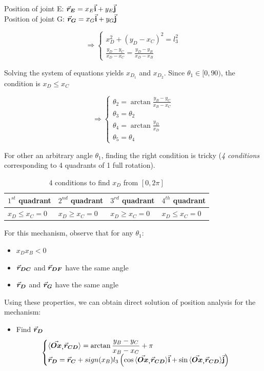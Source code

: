 \begin{frame}
Position of joint E: $\displaystyle \vec{\bm{r}}_{\bm{E}} = x_E\vec{\mathbf{i}} + y_E\vec{\mathbf{j}}$\\
Position of joint G: $\displaystyle \vec{\bm{r}}_{\bm{G}} = x_G\vec{\mathbf{i}} + y_G\vec{\mathbf{j}}$

	\[\Rightarrow \begin{cases}
	x_D^2 + (y_D-x_C)^2 = l_3^2\\
	\displaystyle \frac{y_D-y_C}{x_D-x_C} = \frac{y_D-y_B}{x_D-x_B}
	\end{cases} \]
	
	Solving the system of equations yields $x_{D_1}$ and $x_{D_2}$. Since $\theta_1\in [0,90)$, the condition is $x_D\leq x_C$
	
	\[\Rightarrow\begin{cases}
	\displaystyle \theta_2=\arctan{\frac{y_B-y_C}{x_B-x_C}}\\
	\displaystyle\theta_3=\theta_2\\
	\displaystyle\theta_4=\arctan{\frac{y_D}{x_D}}\\
	\displaystyle\theta_5=\theta_4
	\end{cases}\]

For other an arbitrary angle $\theta_1$, finding the right condition is tricky (\textit{4 conditions} corresponding to 4 quadrants of 1 full rotation).
\end{frame}

\begin{frame}
	\begin{table}
		\centering
		\begin{tabular}{l|l|l|l}
			$1^{st}$ quadrant & $2^{nd}$ quadrant & $3^{rd}$ quadrant & $4^{th}$ quadrant \\\hline
			$x_D\leq x_C=0$   & $x_D\geq x_C=0$   & $x_D\geq x_C=0$   & $x_D\leq x_C=0$
		\end{tabular}
		\caption{4 conditions to find $x_D$ from $[0,2\pi]$}
	\end{table}

	For this mechanism, observe that for any $\theta_1$:
	
	\begin{itemize}
		\item $x_Dx_B<0$
		\item $\vec{\bm{r}}_{\bm{{DC}}}$ and $\vec{\bm{r}}_{\bm{{DF}}}$ have the same angle 
		\item $\vec{\bm{r}}_{\bm{D}}$ and $\vec{\bm{r}}_{\bm{G}}$ have the same angle
	\end{itemize}

	Using these properties, we can obtain direct solution of position analysis for the mechanism:\\
	
	\begin{itemize}
		\item Find $\vec{\bm{r}}_{\bm{D}}$
		\[\begin{cases}
		\displaystyle\langle \vec{\bm{Ox}}_{\bm{,}}\vec{\bm{r}}_{\bm{CD}}\rangle = \arctan{\frac{y_B-y_C}{x_B-x_C}} + \pi\\
		\displaystyle\vec{\bm{r}}_{\bm{D}} = \vec{\bm{r}}_{\bm{C}} + sign(x_B)l_3\left(\cos{\langle\vec{\bm{Ox}}_{\bm{,}}\vec{\bm{r}}_{\bm{CD}}\rangle}\vec{\mathbf{i}} + \sin{\langle \vec{\bm{Ox}}_{\bm{,}}\vec{\bm{r}}_{\bm{CD}}\rangle}\vec{\mathbf{j}}\right)
		\end{cases}\]
	\end{itemize}
\end{frame}

